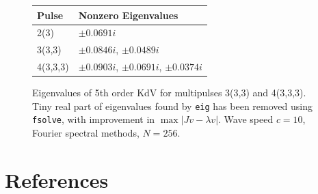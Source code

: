\documentclass[12pt]{article}
\begin{document}
\begin{figure}[H]
\begin{tabular}{l|l}
  Pulse    &  Nonzero Eigenvalues \\ \hline
  2(3)     &     $\pm 0.0691i$ \\ 
  3(3,3)   &     $\pm 0.0846i$, $\pm 0.0489i$   \\ 
  4(3,3,3) &     $\pm 0.0903i$, $\pm 0.0691i$, $\pm 0.0374i$ \\ 
\end{tabular}
\caption{Eigenvalues of 5th order KdV for multipulses 3(3,3) and 4(3,3,3). Tiny real part of eigenvalues found by \texttt{eig} has been removed using \texttt{fsolve}, with improvement in $\max{|Jv - \lambda v|}$. Wave speed $c = 10$, Fourier spectral methods, $N = 256$. }
\end{figure}

\section{References}
\end{document}
